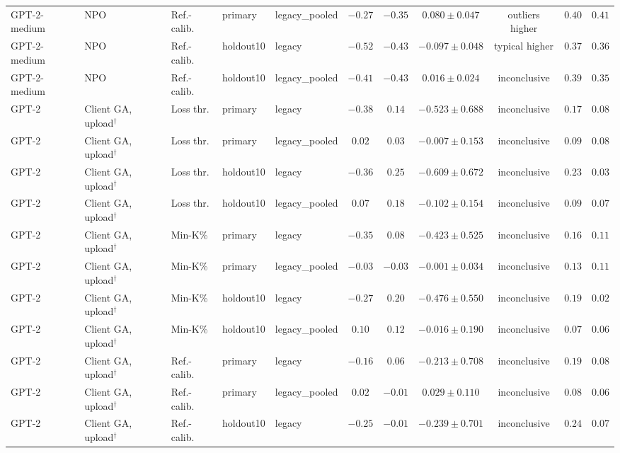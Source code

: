 \begin{table}[t]
\begin{tabular*}{\textwidth}{@{\extracolsep{\fill}}lllllcccccc@{}}
GPT-2-medium & NPO & Ref.-calib. & primary & legacy\_pooled & $-0.27$ & $-0.35$ & $0.080 \pm 0.047$ & outliers higher & $0.40$ & $0.41$ \\
GPT-2-medium & NPO & Ref.-calib. & holdout10 & legacy & $-0.52$ & $-0.43$ & $-0.097 \pm 0.048$ & typical higher & $0.37$ & $0.36$ \\
GPT-2-medium & NPO & Ref.-calib. & holdout10 & legacy\_pooled & $-0.41$ & $-0.43$ & $0.016 \pm 0.024$ & inconclusive & $0.39$ & $0.35$ \\
GPT-2 & Client GA, upload$^{\dagger}$ & Loss thr. & primary & legacy & $-0.38$ & $0.14$ & $-0.523 \pm 0.688$ & inconclusive & $0.17$ & $0.08$ \\
GPT-2 & Client GA, upload$^{\dagger}$ & Loss thr. & primary & legacy\_pooled & $0.02$ & $0.03$ & $-0.007 \pm 0.153$ & inconclusive & $0.09$ & $0.08$ \\
GPT-2 & Client GA, upload$^{\dagger}$ & Loss thr. & holdout10 & legacy & $-0.36$ & $0.25$ & $-0.609 \pm 0.672$ & inconclusive & $0.23$ & $0.03$ \\
GPT-2 & Client GA, upload$^{\dagger}$ & Loss thr. & holdout10 & legacy\_pooled & $0.07$ & $0.18$ & $-0.102 \pm 0.154$ & inconclusive & $0.09$ & $0.07$ \\
GPT-2 & Client GA, upload$^{\dagger}$ & Min-K\% & primary & legacy & $-0.35$ & $0.08$ & $-0.423 \pm 0.525$ & inconclusive & $0.16$ & $0.11$ \\
GPT-2 & Client GA, upload$^{\dagger}$ & Min-K\% & primary & legacy\_pooled & $-0.03$ & $-0.03$ & $-0.001 \pm 0.034$ & inconclusive & $0.13$ & $0.11$ \\
GPT-2 & Client GA, upload$^{\dagger}$ & Min-K\% & holdout10 & legacy & $-0.27$ & $0.20$ & $-0.476 \pm 0.550$ & inconclusive & $0.19$ & $0.02$ \\
GPT-2 & Client GA, upload$^{\dagger}$ & Min-K\% & holdout10 & legacy\_pooled & $0.10$ & $0.12$ & $-0.016 \pm 0.190$ & inconclusive & $0.07$ & $0.06$ \\
GPT-2 & Client GA, upload$^{\dagger}$ & Ref.-calib. & primary & legacy & $-0.16$ & $0.06$ & $-0.213 \pm 0.708$ & inconclusive & $0.19$ & $0.08$ \\
GPT-2 & Client GA, upload$^{\dagger}$ & Ref.-calib. & primary & legacy\_pooled & $0.02$ & $-0.01$ & $0.029 \pm 0.110$ & inconclusive & $0.08$ & $0.06$ \\
GPT-2 & Client GA, upload$^{\dagger}$ & Ref.-calib. & holdout10 & legacy & $-0.25$ & $-0.01$ & $-0.239 \pm 0.701$ & inconclusive & $0.24$ & $0.07$ \\

\end{tabular*}
\end{table}
